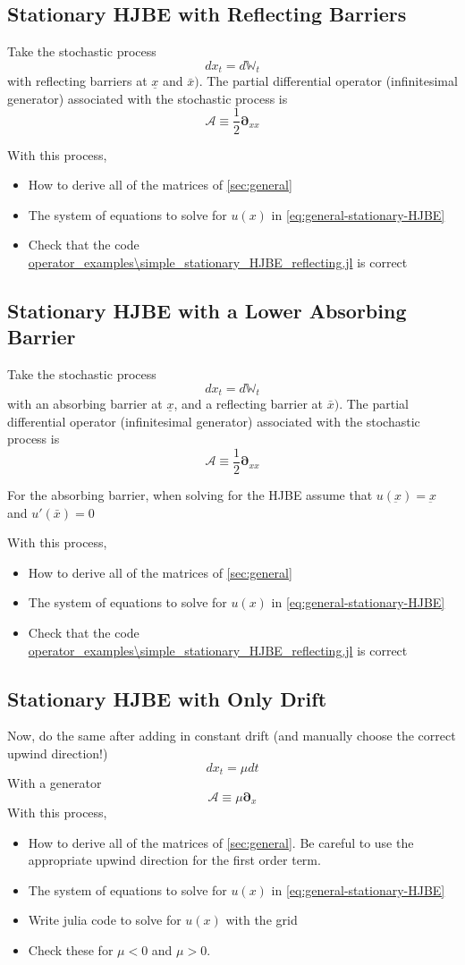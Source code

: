 \documentclass[11pt]{article}
\newcommand{\D}[1][]{\ensuremath{\boldsymbol{\partial}_{#1}}}
\newcommand{\W}{\ensuremath{\mathbb{W}}}
\newcommand{\A}{\ensuremath{\mathcal{A}}}
\begin{document}
\subsection{Stationary HJBE with Reflecting Barriers}
Take the stochastic process
$$
d x_t = d \W_t
$$
with reflecting barriers at $\underline{x}$ and $\bar{x})$.  The partial differential operator (infinitesimal generator) associated with the stochastic process is
$$
	\A \equiv \frac{1}{2}\D[xx]
$$

With this process,
\begin{itemize}
	\item How to derive all of the matrices of \cref{sec:general}
	\item The system of equations to solve for $u(x)$ in \cref{eq:general-stationary-HJBE}
	\item Check that the code \url{operator_examples\simple_stationary_HJBE_reflecting.jl} is correct
\end{itemize}

\subsection{Stationary HJBE with a Lower Absorbing Barrier}
Take the stochastic process
$$
d x_t = d \W_t
$$
with an absorbing barrier at $\underline{x}$, and a reflecting barrier at $\bar{x})$.  The partial differential operator (infinitesimal generator) associated with the stochastic process is
$$
\A \equiv \frac{1}{2}\D[xx]
$$

For the absorbing barrier, when solving for the HJBE assume that $u(\underbar{x}) = \underbar{x}$ and $u'(\bar{x}) = 0$


With this process,
\begin{itemize}
	\item How to derive all of the matrices of \cref{sec:general}
	\item The system of equations to solve for $u(x)$ in \cref{eq:general-stationary-HJBE}
	\item Check that the code \url{operator_examples\simple_stationary_HJBE_reflecting.jl} is correct
\end{itemize}


\subsection{Stationary HJBE with Only Drift}
Now, do the same after adding in constant drift (and manually choose the correct upwind direction!)
$$
d x_t = \mu dt
$$
With a generator
$$
	\A \equiv \mu \D[x]
$$
With this process,
\begin{itemize}
	\item How to derive all of the matrices of \cref{sec:general}.  Be careful to use the appropriate upwind direction for the first order term.
	\item The system of equations to solve for $u(x)$ in \cref{eq:general-stationary-HJBE}
	\item Write julia code to solve for $u(x)$ with the grid
	\item Check these for $\mu < 0$ and $\mu > 0$.
\end{itemize}
\end{document}
